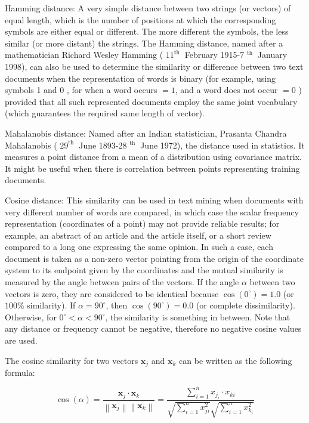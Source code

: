 \documentclass[10pt]{book}
\begin{document}
Hamming distance: A very simple distance between two strings (or vectors) of equal length, which is the number of positions at which the corresponding symbols are either equal or different. The more different the symbols, the less similar (or more distant) the strings. The Hamming distance, named after a mathematician Richard Wesley Hamming ( $11^{\text {th }}$ February 1915-7 ${ }^{\text {th }}$ January 1998), can also be used to determine the similarity or difference between two text documents when the representation of words is binary (for example, using symbols 1 and 0 , for when a word occurs $=1$, and a word does not occur $=0$ ) provided that all such represented documents employ the same joint vocabulary (which guarantees the required same length of vector).

Mahalanobis distance: Named after an Indian statistician, Prasanta Chandra Mahalanobis ( $29^{\text {th }}$ June 1893-28 ${ }^{\text {th }}$ June 1972), the distance used in statistics. It measures a point distance from a mean of a distribution using covariance matrix. It might be useful when there is correlation between points representing training documents.

Cosine distance: This similarity can be used in text mining when documents with very different number of words are compared, in which case the scalar frequency representation (coordinates of a point) may not provide reliable results; for example, an abstract of an article and the article itself, or a short review compared to a long one expressing the same opinion. In such a case, each document is taken as a non-zero vector pointing from the origin of the coordinate system to its endpoint given by the coordinates and the mutual similarity is measured by the angle between pairs of the vectors. If the angle $\alpha$ between two vectors is zero, they are considered to be identical because $\cos \left(0^{\circ}\right)=1.0$ (or $100 \%$ similarity). If $\alpha=90^{\circ}$, then $\cos \left(90^{\circ}\right)=0.0$ (or complete dissimilarity). Otherwise, for $0^{\circ}<\alpha<90^{\circ}$, the similarity is something in between. Note that any distance or frequency cannot be negative, therefore no negative cosine values are used.

The cosine similarity for two vectors $\mathbf{x}_{j}$ and $\mathbf{x}_{k}$ can be written as the following formula:


\begin{equation*}
\cos (\alpha)=\frac{\mathbf{x}_{j} \cdot \mathbf{x}_{k}}{\left\|\mathbf{x}_{j}\right\|\left\|\mathbf{x}_{k}\right\|}=\frac{\sum_{i=1}^{n} x_{j_{i}} \cdot x_{k i}}{\sqrt{\sum_{i=1}^{n} x_{j i}^{2}} \sqrt{\sum_{i=1}^{n} x_{k_{i}}^{2}}} \tag{6.3}
\end{equation*}
\end{document}
